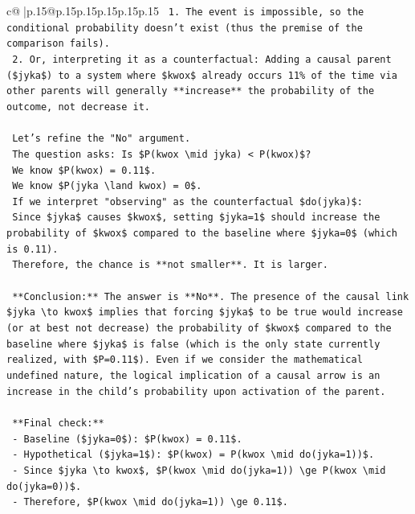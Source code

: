\documentclass{article}
\begin{document}
{\begin{supertabular}{c@{$\;$}|p{.15\linewidth}@{}p{.15\linewidth}p{.15\linewidth}p{.15\linewidth}p{.15\linewidth}p{.15\linewidth}}
{{{\texttt{    1.  The event is impossible, so the conditional probability doesn't exist (thus the premise of the comparison fails).} \\
\texttt{    2.  Or, interpreting it as a counterfactual: Adding a causal parent (\$jyka\$) to a system where \$kwox\$ already occurs 11\% of the time via other parents will generally **increase** the probability of the outcome, not decrease it.} \\
\\ 
\texttt{    Let's refine the "No" argument.} \\
\texttt{    The question asks: Is \$P(kwox \textbackslash{}mid jyka) < P(kwox)\$?} \\
\texttt{    We know \$P(kwox) = 0.11\$.} \\
\texttt{    We know \$P(jyka \textbackslash{}land kwox) = 0\$.} \\
\texttt{    If we interpret "observing" as the counterfactual \$do(jyka)\$:} \\
\texttt{    Since \$jyka\$ causes \$kwox\$, setting \$jyka=1\$ should increase the probability of \$kwox\$ compared to the baseline where \$jyka=0\$ (which is 0.11).} \\
\texttt{    Therefore, the chance is **not smaller**. It is larger.} \\
\\ 
\texttt{    **Conclusion:** The answer is **No**. The presence of the causal link \$jyka \textbackslash{}to kwox\$ implies that forcing \$jyka\$ to be true would increase (or at best not decrease) the probability of \$kwox\$ compared to the baseline where \$jyka\$ is false (which is the only state currently realized, with \$P=0.11\$). Even if we consider the mathematical undefined nature, the logical implication of a causal arrow is an increase in the child's probability upon activation of the parent.} \\
\\ 
\texttt{    **Final check:**} \\
\texttt{    {-} Baseline (\$jyka=0\$): \$P(kwox) = 0.11\$.} \\
\texttt{    {-} Hypothetical (\$jyka=1\$): \$P(kwox) = P(kwox \textbackslash{}mid do(jyka=1))\$.} \\
\texttt{    {-} Since \$jyka \textbackslash{}to kwox\$, \$P(kwox \textbackslash{}mid do(jyka=1)) \textbackslash{}ge P(kwox \textbackslash{}mid do(jyka=0))\$.} \\
\texttt{    {-} Therefore, \$P(kwox \textbackslash{}mid do(jyka=1)) \textbackslash{}ge 0.11\$.} \\
}}}
\end{supertabular}}
\end{document}
